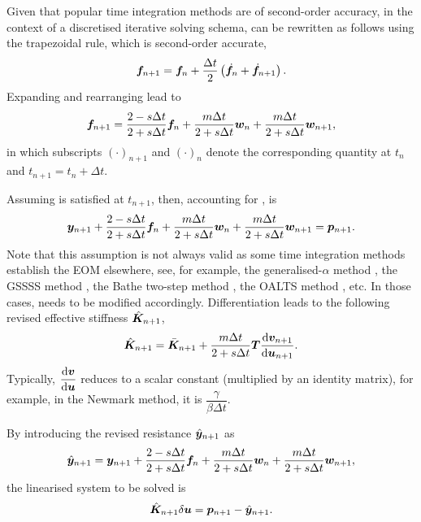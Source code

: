 Given that popular time integration methods are of second-order accuracy, in the context of a discretised iterative solving schema,  can be rewritten as follows using the trapezoidal rule, which is second-order accurate,
\begin{gather}
\bm{f}_{n+1}=\bm{f}_n+\dfrac{\Delta{}t}{2}\left(\dot{\bm{f}}_n+\dot{\bm{f}}_{n+1}\right).
\end{gather}
Expanding and rearranging lead to
\begin{gather}\label{eq:discretised_c}
\bm{f}_{n+1}=\dfrac{2-s\Delta{}t}{2+s\Delta{}t}\bm{f}_n+\dfrac{m\Delta{}t}{2+s\Delta{}t}\bm{w}_n+\dfrac{m\Delta{}t}{2+s\Delta{}t}\bm{w}_{n+1},
\end{gather}
in which subscripts $\left(\cdot\right)_{n+1}$ and $\left(\cdot\right)_n$ denote the corresponding quantity at $t_n$ and $t_{n+1}=t_n+\Delta{}t$.

Assuming  is satisfied at $t_{n+1}$, then, accounting for ,  is
\begin{gather}\label{eq:residual}
\bm{y}_{n+1}+\dfrac{2-s\Delta{}t}{2+s\Delta{}t}\bm{f}_n+\dfrac{m\Delta{}t}{2+s\Delta{}t}\bm{w}_n+\dfrac{m\Delta{}t}{2+s\Delta{}t}\bm{w}_{n+1}=\bm{p}_{n+1}.
\end{gather}
Note that this assumption is not always valid as some time integration methods establish the EOM elsewhere, see, for example, the generalised-$\alpha$ method \citep{Chung1993}, the GSSSS method \citep{Zhou2003}, the Bathe two-step method \citep{Noh2019}, the OALTS method \citep{Zhang2021}, etc. In those cases,  needs to be modified accordingly.
Differentiation leads to the following revised effective stiffness $\hat{\bm{K}}_{n+1}$,
\begin{gather}\label{eq:revised_k}
\hat{\bm{K}}_{n+1}=\bar{\bm{K}}_{n+1}+\dfrac{m\Delta{}t}{2+s\Delta{}t}\bm{T}\dfrac{\mathrm{d}\bm{v}_{n+1}}{\mathrm{d}\bm{u}_{n+1}}.
\end{gather}
Typically, $\dfrac{\mathrm{d}\bm{v}}{\mathrm{d}\bm{u}}$ reduces to a scalar constant (multiplied by an identity matrix), for example, in the Newmark method, it is $\dfrac{\gamma}{\beta\Delta{}t}$.

By introducing the revised resistance $\hat{\bm{y}}_{n+1}$ as
\begin{gather}\label{eq:revised_y}
\hat{\bm{y}}_{n+1}=\bm{y}_{n+1}+\dfrac{2-s\Delta{}t}{2+s\Delta{}t}\bm{f}_n+\dfrac{m\Delta{}t}{2+s\Delta{}t}\bm{w}_n+\dfrac{m\Delta{}t}{2+s\Delta{}t}\bm{w}_{n+1},
\end{gather}
the linearised system to be solved is
\begin{gather}\label{eq:revised_system}
\hat{\bm{K}}_{n+1}\delta\bm{u}=\bm{p}_{n+1}-\hat{\bm{y}}_{n+1}.
\end{gather}

